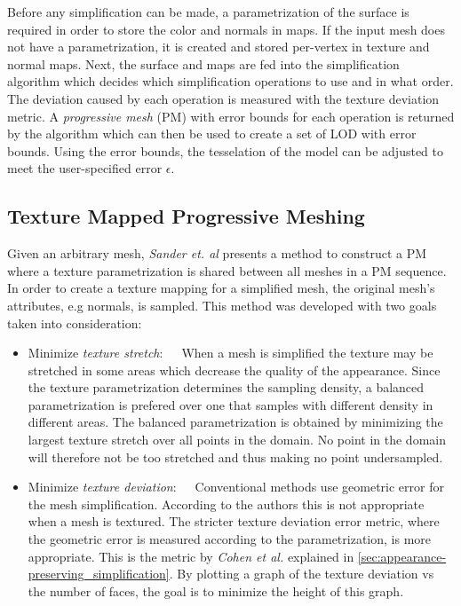 Before any simplification can be made, a parametrization of the surface is required in order to store the color and normals in maps. If the input mesh does not have a parametrization, it is created and stored per-vertex in texture and normal maps. Next, the surface and maps are fed into the simplification algorithm which decides which simplification operations to use and in what order. The deviation caused by each operation is measured with the texture deviation metric. A \emph{progressive mesh} (PM) with error bounds for each operation is returned by the algorithm which can then be used to create a set of LOD with error bounds. Using the error bounds, the tesselation of the model can be adjusted to meet the user-specified error $\epsilon$.

\subsection{Texture Mapped Progressive Meshing} \label{sec:texture_mapped_progressive_meshing}
Given an arbitrary mesh, \emph{Sander et. al} \cite{sander2001texture} presents a method to construct a PM where a texture parametrization is shared between all meshes in a PM sequence. In order to create a texture mapping for a simplified mesh, the original mesh's attributes, e.g normals, is sampled. This method was developed with two goals taken into consideration:
\begin{itemize}
\item{Minimize \emph{texture stretch}:}~~~When a mesh is simplified the texture may be stretched in some areas which decrease the quality of the appearance. Since the texture parametrization determines the sampling density, a balanced parametrization is prefered over one that samples with different density in different areas. The balanced parametrization is obtained by minimizing the largest texture stretch over all points in the domain. No point in the domain will therefore not be too stretched and thus making no point undersampled. 
\item{Minimize \emph{texture deviation}:}~~~Conventional methods use geometric error for the mesh simplification. According to the authors this is not appropriate when a mesh is textured. The stricter texture deviation error metric, where the geometric error is measured according to the parametrization, is more appropriate. This is the metric by \emph{Cohen et al.} \cite{cohen1998appearance} explained in \ref{sec:appearance-preserving_simplification}. By plotting a graph of the texture deviation vs the number of faces, the goal is to minimize the height of this graph.
\end{itemize}

